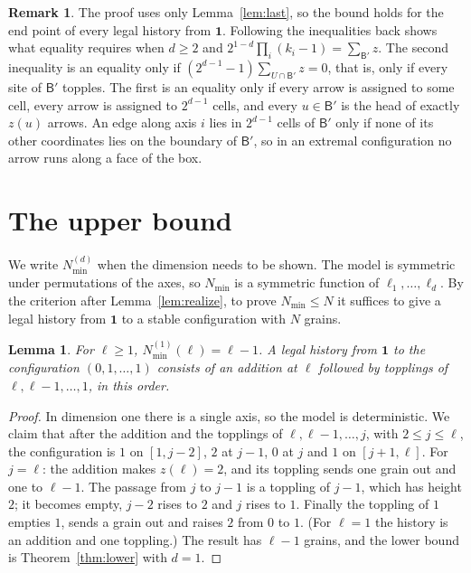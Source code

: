 \documentclass[11pt]{amsart}
\newtheorem{lemma}[theorem]{Lemma}
\theoremstyle{definition}
\newtheorem{remark}[theorem]{Remark}
\newcommand{\one}{\mathbf 1}
\newcommand{\Nmin}{N_{\min}}
\newcommand{\B}{\mathsf B}
\begin{document}
\begin{remark}\label{rem:sharp}
The proof uses only Lemma~\ref{lem:last}, so the bound holds for the end point of every legal history from $\one$. Following the inequalities back shows what equality requires when $d\ge2$ and $2^{1-d}\prod_i(k_i-1)=\sum_{\B'}z$. The second inequality is an equality only if $(2^{d-1}-1)\sum_{U\cap\B'}z=0$, that is, only if every site of $\B'$ topples. The first is an equality only if every arrow is assigned to some cell, every arrow is assigned to $2^{d-1}$ cells, and every $u\in\B'$ is the head of exactly $z(u)$ arrows. An edge along axis $i$ lies in $2^{d-1}$ cells of $\B'$ only if none of its other coordinates lies on the boundary of $\B'$, so in an extremal configuration no arrow runs along a face of the box.
\end{remark}

\section{The upper bound}\label{sec:upper}

We write $\Nmin^{(d)}$ when the dimension needs to be shown. The model is symmetric under permutations of the axes, so $\Nmin$ is a symmetric function of $\ell_1,\dots,\ell_d$. By the criterion after Lemma~\ref{lem:realize}, to prove $\Nmin\le N$ it suffices to give a legal history from $\one$ to a stable configuration with $N$ grains.

\begin{lemma}\label{lem:chain}
For $\ell\ge1$, $\Nmin^{(1)}(\ell)=\ell-1$. A legal history from $\one$ to the configuration $(0,1,\dots,1)$ consists of an addition at $\ell$ followed by topplings of $\ell,\ell-1,\dots,1$, in this order.
\end{lemma}

\begin{proof}
In dimension one there is a single axis, so the model is deterministic. We claim that after the addition and the topplings of $\ell,\ell-1,\dots,j$, with $2\le j\le\ell$, the configuration is $1$ on $[1,j-2]$, $2$ at $j-1$, $0$ at $j$ and $1$ on $[j+1,\ell]$. For $j=\ell$: the addition makes $z(\ell)=2$, and its toppling sends one grain out and one to $\ell-1$. The passage from $j$ to $j-1$ is a toppling of $j-1$, which has height $2$; it becomes empty, $j-2$ rises to $2$ and $j$ rises to $1$. Finally the toppling of $1$ empties $1$, sends a grain out and raises $2$ from $0$ to $1$. (For $\ell=1$ the history is an addition and one toppling.) The result has $\ell-1$ grains, and the lower bound is Theorem~\ref{thm:lower} with $d=1$.
\end{proof}
\end{document}
